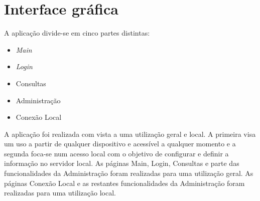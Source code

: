\documentclass[11pt,twoside,a4paper]{report}
\begin{document}
\section{Interface gráfica}
A aplicação divide-se em cinco partes distintas:
\begin{itemize}
	\item \textit{Main}
	\item \textit{Login}
	\item Consultas
	\item Administração
	\item Conexão Local
\end{itemize}
A aplicação foi realizada com vista a uma utilização geral e local. A primeira visa um uso a partir de qualquer dispositivo e acessível a qualquer momento e a segunda foca-se num acesso local com o objetivo de configurar e definir a informação no servidor local. As páginas Main, Login, Consultas e parte das funcionalidades da Administração foram realizadas para uma utilização geral. As páginas Conexão Local e as restantes funcionalidades da Administração foram realizadas para uma utilização local.
\end{document}
